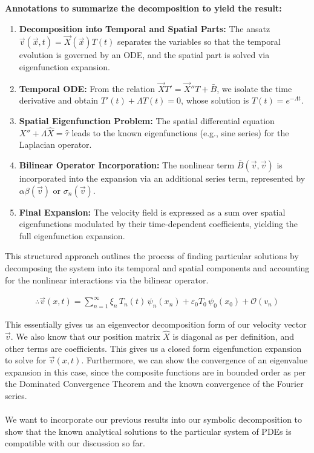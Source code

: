 \documentclass[12pt]{article}
\begin{document}
\textbf{Annotations to summarize the decomposition to yield the result:}
\begin{enumerate}
    \item \textbf{Decomposition into Temporal and Spatial Parts:} The ansatz \(\vec{v}(\vec{x},t) = \vec{X}(\vec{x}) T(t)\) separates the variables so that the temporal evolution is governed by an ODE, and the spatial part is solved via eigenfunction expansion.
    \item \textbf{Temporal ODE:} From the relation \(\vec{X}T' = \vec{X}''T + \bar{B}\), we isolate the time derivative and obtain \(T'(t) + \Lambda T(t) = 0\), whose solution is \(T(t) = e^{-\Lambda t}\).
    \item \textbf{Spatial Eigenfunction Problem:} The spatial differential equation \(X'' + \Lambda \hat{X} = \hat{\tau}\) leads to the known eigenfunctions (e.g., sine series) for the Laplacian operator.
    \item \textbf{Bilinear Operator Incorporation:} The nonlinear term \(\bar{B}(\vec{v}, \vec{v})\) is incorporated into the expansion via an additional series term, represented by \(\alpha\beta(\vec{v})\) or \(\sigma_{n}(\vec{v})\).
    \item \textbf{Final Expansion:} The velocity field is expressed as a sum over spatial eigenfunctions modulated by their time-dependent coefficients, yielding the full eigenfunction expansion.
\end{enumerate}

This structured approach outlines the process of finding particular solutions by decomposing the system into its temporal and spatial components and accounting for the nonlinear interactions via the bilinear operator.



\begin{align}
    \therefore \vec{v}(x,t) = \sum_{n=1}^{\infty} \xi_{n} \, T_{n}(t) \, \psi_{n}(x_{n}) + \varepsilon_{0} T_{0}\,\psi_{0}(x_{0}) + \mathcal{O} (v_{n})
\end{align}

This essentially gives us an eigenvector decomposition form of our velocity vector $\vec v$. We also know that our position matrix $\hat X$ is diagonal as per definition, and other terms are coefficients. This gives us a closed form eigenfunction expansion to solve for $\vec v (x,t)$. Furthermore, we can show the convergence of an eigenvalue expansion in this case, since the composite functions are in bounded order as per the Dominated Convergence Theorem and the known convergence of the Fourier series. \\\\
We want to incorporate our previous results into our symbolic decomposition to show that the known analytical solutions to the particular system of PDEs is compatible with our discussion so far. 
\end{document}
